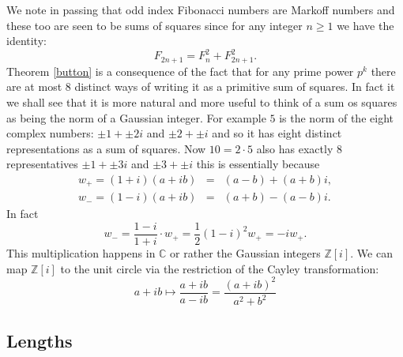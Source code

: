 \documentclass[14pt,a4paper]{amsart}
\def\ZZ{\mathbb{Z}}
\begin{document}


We note in passing that odd index Fibonacci numbers are Markoff
numbers and these too are seen to be sums of squares since for any integer $n \geq 1$ we have the identity:
$$F_{2n+1} = F_n^2 + F_{2n+1}^2.$$
Theorem \ref{button} is a consequence of the
fact that for any prime power $p^k$ there are at most 8 distinct
ways of writing it as a primitive sum of squares. In fact it we shall see that
it is more natural and more useful to think of a sum os squares as
being the norm of a Gaussian integer. For example $5$ is the norm of the eight complex numbers:
$\pm 1 + \pm 2i$ and $\pm 2 + \pm i$
and so it has eight distinct representations as a sum of squares.
Now $10 = 2\cdot 5$ also has exactly $8$ representatives
$\pm 1 + \pm 3i$ and $\pm 3 + \pm i$
this is essentially because 
\begin{eqnarray*}
w_+ = (1+i)(a+ib) &=& (a-b) + (a+b)i, \\
w_-= (1-i)(a+ib) &=& (a+b)  -(a-b)i .
\end{eqnarray*}
In fact 
$$ w_- = \frac{1-i}{1+i}\cdot w_+ = \frac12 (1-i)^2 w_+ = -i w_+.$$
This multiplication happens in $\mathbb{C}$ or rather the Gaussian
integers $\ZZ[i]$. We can map $\ZZ[i]$
to the unit circle via the restriction of the Cayley transformation:
\begin{equation*}
	a + ib \mapsto 	\frac{ a + ib}{a - ib} = \frac{ (a +
	ib)^2}{a^2 + b^2}
\end{equation*}


\subsection{Lengths}
\end{document}
